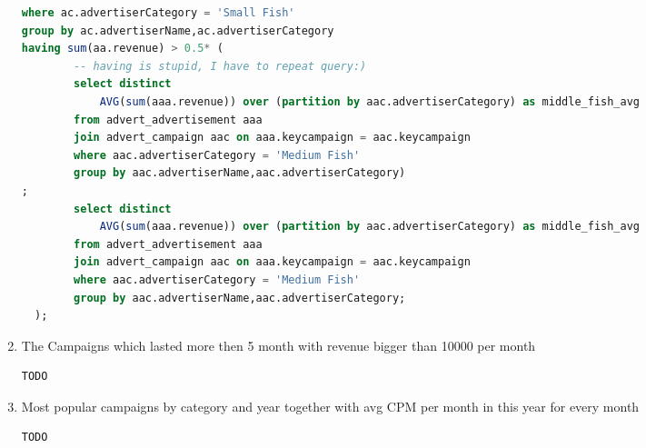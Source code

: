 \begin{enumerate}
\begin{lstlisting}[language=sql]
where ac.advertiserCategory = 'Small Fish'
group by ac.advertiserName,ac.advertiserCategory
having sum(aa.revenue) > 0.5* (
        -- having is stupid, I have to repeat query:)
        select distinct
            AVG(sum(aaa.revenue)) over (partition by aac.advertiserCategory) as middle_fish_avg
        from advert_advertisement aaa 
        join advert_campaign aac on aaa.keycampaign = aac.keycampaign
        where aac.advertiserCategory = 'Medium Fish'   
        group by aac.advertiserName,aac.advertiserCategory)
;
        select distinct
            AVG(sum(aaa.revenue)) over (partition by aac.advertiserCategory) as middle_fish_avg
        from advert_advertisement aaa 
        join advert_campaign aac on aaa.keycampaign = aac.keycampaign
        where aac.advertiserCategory = 'Medium Fish'   
        group by aac.advertiserName,aac.advertiserCategory;
  );      
  \end{lstlisting}
\item    The Campaigns which lasted more then 5 month with revenue bigger than 10000 per month
  \begin{lstlisting}[language=sql] 
  TODO
  \end{lstlisting}
\item    Most popular campaigns by category and year together with avg CPM per month in this year for every month
  \begin{lstlisting}[language=sql] 
  TODO
  \end{lstlisting}
\end{enumerate}

